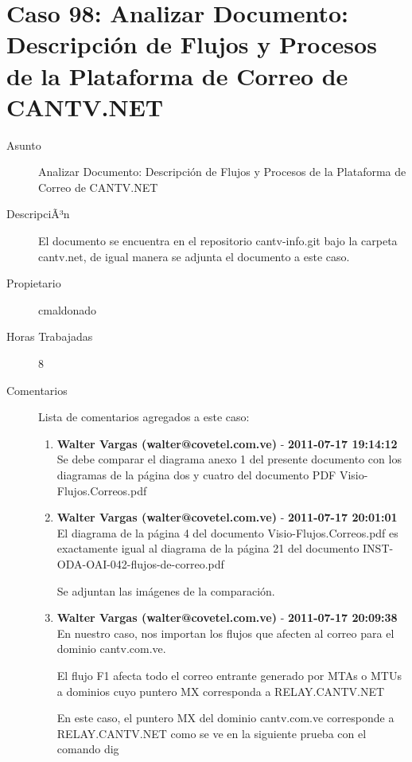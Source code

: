 
\section{Caso 98: Analizar Documento: Descripción de Flujos y Procesos de la Plataforma de Correo de CANTV.NET }

\begin{description}

\item[Asunto] Analizar Documento: Descripción de Flujos y Procesos de la Plataforma de Correo de CANTV.NET\item[DescripciÃ³n] El documento se encuentra en el repositorio cantv-info.git bajo la carpeta
cantv.net, de igual manera se adjunta el documento a este caso.\item[Propietario] cmaldonado\item[Horas Trabajadas] 8

\item[Comentarios] Lista de comentarios agregados a este caso:  
\begin{enumerate}
        \item {\bfseries Walter Vargas (walter@covetel.com.ve)  } - {\bfseries 2011-07-17 19:14:12} \\ Se debe comparar el diagrama anexo 1 del presente documento con los diagramas
de la página dos y cuatro del documento PDF Visio-Flujos.Correos.pdf        \item {\bfseries Walter Vargas (walter@covetel.com.ve)  } - {\bfseries 2011-07-17 20:01:01} \\ El diagrama de la página 4 del documento Visio-Flujos.Correos.pdf es
exactamente igual al diagrama de la página 21 del documento
INST-ODA-OAI-042-flujos-de-correo.pdf

Se adjuntan las imágenes de la comparación.        \item {\bfseries Walter Vargas (walter@covetel.com.ve)  } - {\bfseries 2011-07-17 20:09:38} \\ En nuestro caso, nos importan los flujos que afecten al correo para el dominio
cantv.com.ve.

El flujo F1 afecta todo el correo entrante generado por MTAs o MTUs a dominios
cuyo puntero MX corresponda a RELAY.CANTV.NET

En este caso, el puntero MX del dominio cantv.com.ve corresponde a
RELAY.CANTV.NET como se ve en la siguiente prueba con el comando dig


\end{enumerate}
\end{description}
